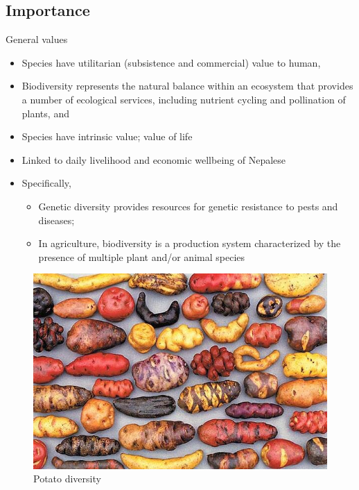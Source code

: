 \documentclass[ignorenonframetext,aspectratio=169]{beamer}
\providecommand{\tightlist}{%
  \setlength{\itemsep}{0pt}\setlength{\parskip}{0pt}}
\begin{document}
\hypertarget{importance}{%
\subsection{Importance}\label{importance}}

\begin{frame}{General values}
\protect\hypertarget{general-values}{}

\begin{itemize}
\tightlist
\item
  Species have utilitarian (subsistence and commercial) value to human,
\item
  Biodiversity represents the natural balance within an ecosystem that
  provides a number of ecological services, including nutrient cycling
  and pollination of plants, and
\item
  Species have intrinsic value; value of life
\item
  Linked to daily livelihood and economic wellbeing of Nepalese
\item
  Specifically,

  \begin{itemize}
  \tightlist
  \item
    Genetic diversity provides resources for genetic resistance to pests
    and diseases;
  \item
    In agriculture, biodiversity is a production system characterized by
    the presence of multiple plant and/or animal species
  \end{itemize}
\end{itemize}

\end{frame}

\begin{frame}{}
\protect\hypertarget{section-3}{}

\begin{figure}
\includegraphics[width=0.7\linewidth]{./../images/twttr/potato_diversity_D7N0aiUXYAIXcLq} \caption{Potato diversity}\label{fig:potato-diversity}
\end{figure}

\end{frame}
\end{document}
